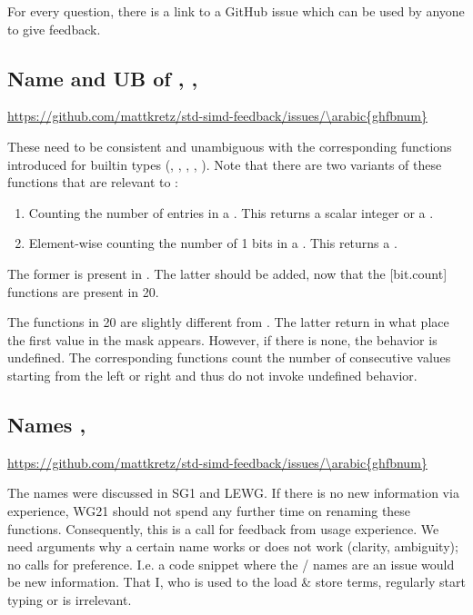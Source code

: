 For every question, there is a link to a GitHub issue which can be used by anyone to give feedback.

\newcommand\ghfeedback{
  \addtocounter{ghfbnum}{1}%
  \begin{flushright}
    \url{https://github.com/mattkretz/std-simd-feedback/issues/\arabic{ghfbnum}}
  \end{flushright}}

\subsection{Name and UB of , , } \ghfeedback
These need to be consistent and unambiguous with the corresponding functions introduced for builtin types
(, , , , ).
Note that there are two variants of these functions that are relevant to \simdT:
\begin{enumerate}
  \item Counting the number of entries in a \maskT.
    This returns a scalar integer or a .
  \item Element-wise counting the number of 1 bits in a \simdT.
    This returns a \simd[<int>].
\end{enumerate}
The former is present in \textcite{pts2}.
The latter should be added, now that the [bit.count] functions are present in \CC{}20.

The  functions in \CC{}20 are slightly different from .
The latter return in what place the first \true value in the mask appears.
However, if there is none, the behavior is undefined.
The corresponding  functions count the number of consecutive \false values starting from the left or right and thus do not invoke undefined behavior.

\subsection{Names , } \ghfeedback
The names were discussed in SG1 and LEWG.
If there is no new information via experience, WG21 should not spend any further time on renaming these functions.
Consequently, this is a call for feedback from usage experience.
We need arguments why a certain name works or does not work (clarity, ambiguity); no calls for preference.
I.e. a code snippet where the / names are an issue would be new information.
That I, who is used to the load \& store terms, regularly start typing  or  is irrelevant.

